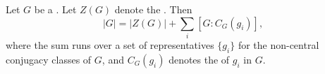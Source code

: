 \begin{lemma} \label{lemma:class_equation_for_finite_groups}
Let $G$ be a  . Let $Z(G)$ denote the . Then
$$|G| = |Z(G)| + \sum_{i} [G : C_G(g_i)],$$
where the sum runs over a set of representatives $\{g_i\}$ for the non-central conjugacy classes of $G$, and $C_G(g_i)$ denotes the  of $g_i$ in $G$.
\end{lemma}
